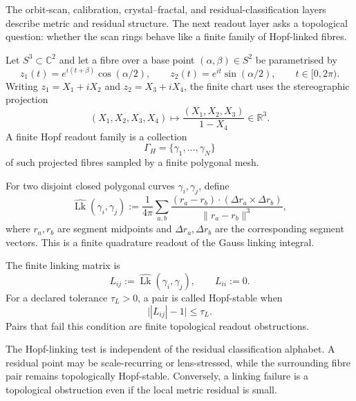 The orbit-scan, calibration, crystal--fractal, and residual-classification
layers describe metric and residual structure. The next readout layer asks a
topological question: whether the scan rings behave like a finite family of
Hopf-linked fibres.

\begin{definition}
Let \(S^3\subset\mathbb C^2\) and let a fibre over a base point
\((\alpha,\beta)\in S^2\) be parametrised by
\[
    z_1(t)=e^{i(t+\beta)}\cos(\alpha/2),
    \qquad
    z_2(t)=e^{it}\sin(\alpha/2),
    \qquad
    t\in[0,2\pi).
\]
Writing \(z_1=X_1+iX_2\) and \(z_2=X_3+iX_4\), the finite chart uses the
stereographic projection
\[
    (X_1,X_2,X_3,X_4)
    \longmapsto
    \frac{(X_1,X_2,X_3)}{1-X_4}
    \in\mathbb R^3.
\]
A finite Hopf readout family is a collection
\[
    \Gamma_H=\{\gamma_1,\ldots,\gamma_N\}
\]
of such projected fibres sampled by a finite polygonal mesh.
\end{definition}

\begin{definition}
For two disjoint closed polygonal curves \(\gamma_i,\gamma_j\), define
\[
    \widehat{\operatorname{Lk}}(\gamma_i,\gamma_j)
    :=
    \frac{1}{4\pi}
    \sum_{a,b}
    \frac{
    (r_a-r_b)\cdot(\Delta r_a\times \Delta r_b)
    }{\|r_a-r_b\|^3},
\]
where \(r_a,r_b\) are segment midpoints and \(\Delta r_a,\Delta r_b\) are the
corresponding segment vectors. This is a finite quadrature readout of the
Gauss linking integral.
\end{definition}

\begin{definition}
The finite linking matrix is
\[
    L_{ij}:=\widehat{\operatorname{Lk}}(\gamma_i,\gamma_j),
    \qquad
    L_{ii}:=0.
\]
For a declared tolerance \(\tau_L>0\), a pair is called Hopf-stable when
\[
    \bigl||L_{ij}|-1\bigr|\leq \tau_L.
\]
Pairs that fail this condition are finite topological readout obstructions.
\end{definition}

\begin{proposition}
The Hopf-linking test is independent of the residual classification alphabet.
A residual point may be scale-recurring or lens-stressed, while the surrounding
fibre pair remains topologically Hopf-stable. Conversely, a linking failure is
a topological obstruction even if the local metric residual is small.
\end{proposition}

